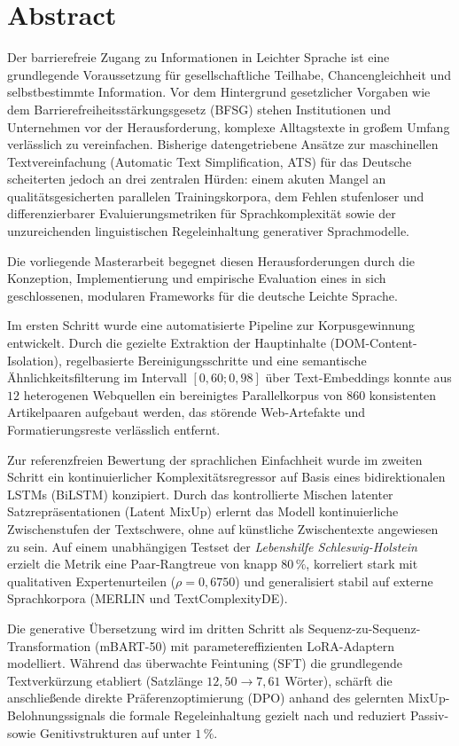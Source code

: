 \section*{Abstract}

Der barrierefreie Zugang zu Informationen in Leichter Sprache ist eine grundlegende Voraussetzung für gesellschaftliche Teilhabe, Chancengleichheit und selbstbestimmte Information. Vor dem Hintergrund gesetzlicher Vorgaben wie dem Barrierefreiheitsstärkungsgesetz (BFSG) stehen Institutionen und Unternehmen vor der Herausforderung, komplexe Alltagstexte in großem Umfang verlässlich zu vereinfachen. Bisherige datengetriebene Ansätze zur maschinellen Textvereinfachung (Automatic Text Simplification, ATS) für das Deutsche scheiterten jedoch an drei zentralen Hürden: einem akuten Mangel an qualitätsgesicherten parallelen Trainingskorpora, dem Fehlen stufenloser und differenzierbarer Evaluierungsmetriken für Sprachkomplexität sowie der unzureichenden linguistischen Regeleinhaltung generativer Sprachmodelle.

Die vorliegende Masterarbeit begegnet diesen Herausforderungen durch die Konzeption, Implementierung und empirische Evaluation eines in sich geschlossenen, modularen Frameworks für die deutsche Leichte Sprache.

Im ersten Schritt wurde eine automatisierte Pipeline zur Korpusgewinnung entwickelt. Durch die gezielte Extraktion der Hauptinhalte (DOM-Content-Isolation), regelbasierte Bereinigungsschritte und eine semantische Ähnlichkeitsfilterung im Intervall $[0{,}60; 0{,}98]$ über Text-Embeddings konnte aus $12$ heterogenen Webquellen ein bereinigtes Parallelkorpus von $860$ konsistenten Artikelpaaren aufgebaut werden, das störende Web-Artefakte und Formatierungsreste verlässlich entfernt.

Zur referenzfreien Bewertung der sprachlichen Einfachheit wurde im zweiten Schritt ein kontinuierlicher Komplexitätsregressor auf Basis eines bidirektionalen LSTMs (BiLSTM) konzipiert. Durch das kontrollierte Mischen latenter Satzrepräsentationen (Latent MixUp) erlernt das Modell kontinuierliche Zwischenstufen der Textschwere, ohne auf künstliche Zwischentexte angewiesen zu sein. Auf einem unabhängigen Testset der \textit{Lebenshilfe Schleswig-Holstein} erzielt die Metrik eine Paar-Rangtreue von knapp $80\,\%$, korreliert stark mit qualitativen Expertenurteilen ($\rho = 0{,}6750$) und generalisiert stabil auf externe Sprachkorpora (MERLIN und TextComplexityDE).

Die generative Übersetzung wird im dritten Schritt als Sequenz-zu-Sequenz-Transformation (mBART-50) mit parametereffizienten LoRA-Adaptern modelliert. Während das überwachte Feintuning (SFT) die grundlegende Textverkürzung etabliert (Satzlänge $12{,}50 \to 7{,}61$ Wörter), schärft die anschließende direkte Präferenzoptimierung (DPO) anhand des gelernten MixUp-Belohnungssignals die formale Regeleinhaltung gezielt nach und reduziert Passiv- sowie Genitivstrukturen auf unter $1\,\%$.

